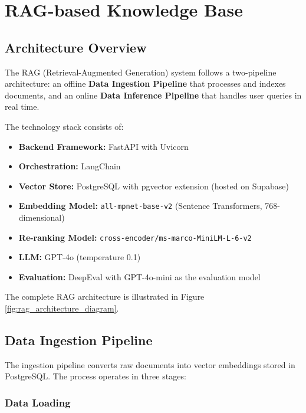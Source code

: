 
\section{RAG-based Knowledge Base}

\subsection{Architecture Overview}

The RAG (Retrieval-Augmented Generation) system follows a two-pipeline architecture: an offline \textbf{Data Ingestion Pipeline} that processes and indexes documents, and an online \textbf{Data Inference Pipeline} that handles user queries in real time.

The technology stack consists of:
\begin{itemize}
    \item \textbf{Backend Framework:} FastAPI with Uvicorn
    \item \textbf{Orchestration:} LangChain
    \item \textbf{Vector Store:} PostgreSQL with pgvector extension (hosted on Supabase)
    \item \textbf{Embedding Model:} \texttt{all-mpnet-base-v2} (Sentence Transformers, 768-dimensional)
    \item \textbf{Re-ranking Model:} \texttt{cross-encoder/ms-marco-MiniLM-L-6-v2}
    \item \textbf{LLM:} GPT-4o (temperature 0.1)
    \item \textbf{Evaluation:} DeepEval with GPT-4o-mini as the evaluation model
\end{itemize}

The complete RAG architecture is illustrated in Figure \ref{fig:rag_architecture_diagram}.

\subsection{Data Ingestion Pipeline}

The ingestion pipeline converts raw documents into vector embeddings stored in PostgreSQL. The process operates in three stages:

\subsubsection{Data Loading}

